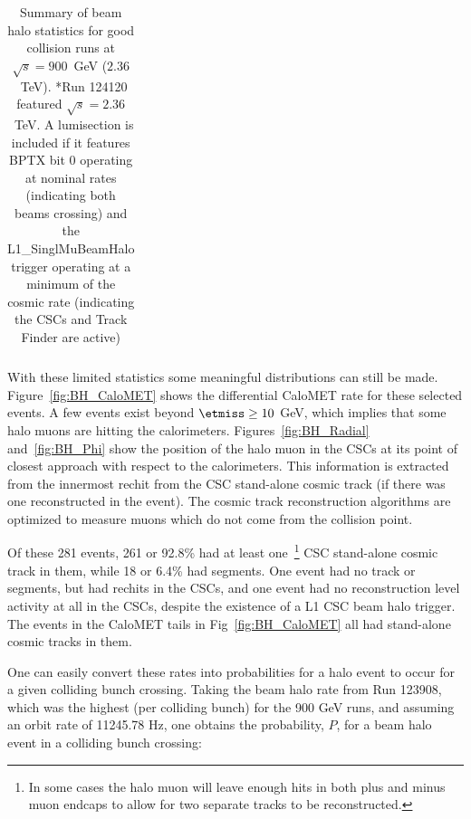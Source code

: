 \begin{table}[h]
\begin{center}
\begin{tabular}{|c|c|c|c|c|c|c|}
\end{tabular}
\end{center}
\caption{Summary of beam halo statistics for good collision runs at $\sqrt{s}=900$~GeV ($2.36$~TeV). *Run 124120 featured $\sqrt{s}=2.36$~TeV. A lumisection is included if it features BPTX bit 0 operating at nominal rates (indicating both beams crossing) and the L1\_SinglMuBeamHalo trigger operating at a minimum of the cosmic rate (indicating the CSCs and Track Finder are active)}
\label{tab:BHStats}
\end{table}

With these limited statistics some meaningful distributions can still be made. Figure~\ref{fig:BH_CaloMET} shows the differential  CaloMET rate for these selected events.  A few events exist beyond $\etmiss \ge 10$ GeV, which implies that some halo muons are hitting the calorimeters. Figures~\ref{fig:BH_Radial} and~\ref{fig:BH_Phi} show the position of the halo muon in the CSCs at its point of closest approach with respect to the calorimeters.  This information is extracted from the innermost rechit from the  CSC stand-alone cosmic track (if there was one reconstructed in the event).  The cosmic track reconstruction algorithms are optimized to measure muons which do not come from the collision point.

Of these 281 events, 261 or 92.8\% had at least one~\footnote{In some cases the halo muon will leave enough hits in both plus and minus muon endcaps to allow for two separate tracks to be reconstructed.} CSC stand-alone cosmic track in them, while 18 or 6.4\% had segments.  One event had no track or segments, but had rechits in the CSCs, and one event had no reconstruction level activity at all in the CSCs, despite the existence of a L1 CSC beam halo trigger.  The events in the CaloMET tails in Fig~\ref{fig:BH_CaloMET} all had stand-alone cosmic tracks in them.  

One can easily convert these rates into probabilities for a halo event to occur for a given colliding bunch crossing. Taking the beam halo rate from Run 123908, which was the highest (per colliding bunch) for the 900 GeV runs, and assuming an orbit rate of 11245.78 Hz, one obtains the probability, $P$, for a beam halo event in a colliding bunch crossing:

